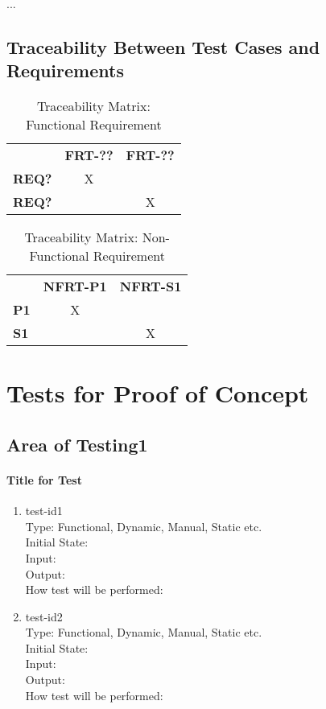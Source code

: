 \documentclass[12pt, titlepage]{article}
\begin{document}
...

\subsection{Traceability Between Test Cases and Requirements}
\begin{table}[H]
    \centering
    \caption{Traceability Matrix: Functional Requirement}
    \begin{tabular}{lcc}
        ~ & \textbf{FRT-??} & \textbf{FRT-??}\\
        \textbf{REQ?} & X & ~\\
        \textbf{REQ?} & ~ & X\\
    \end{tabular}
    \label{Traceability Matrix: Functional Requirement}
\end{table}

\begin{table}[H]
    \centering
    \caption{Traceability Matrix: Non-Functional Requirement}
    \begin{tabular}{lcc}
        ~ & \textbf{NFRT-P1} & \textbf{NFRT-S1}\\
        \textbf{P1} & X & ~\\
        \textbf{S1} & ~ & X\\
    \end{tabular}
    \label{Traceability Matrix: Non-Functional Requirement}
\end{table}

\section{Tests for Proof of Concept}

\subsection{Area of Testing1}
        
\paragraph{Title for Test}

\begin{enumerate}

\item{test-id1}\\
Type: Functional, Dynamic, Manual, Static etc.\\
Initial State: \\
Input: \\
Output: \\
How test will be performed: \\

\item{test-id2}\\
Type: Functional, Dynamic, Manual, Static etc.\\
Initial State: \\
Input: \\
Output: \\
How test will be performed: 

\end{enumerate}
\end{document}
